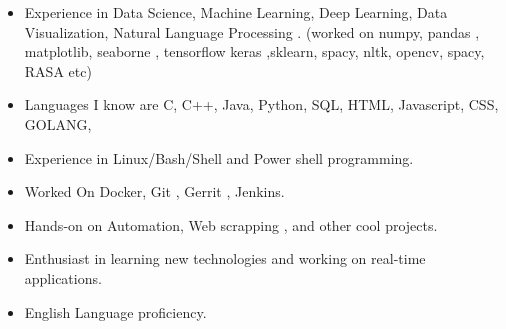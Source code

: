 \documentclass[10pt,a4paper,ragged2e,withhyper]{altacv}
\begin{document}
\begin{paracol}{2}
\begin{itemize}
\item Experience in Data Science, Machine Learning, Deep Learning, Data Visualization, Natural Language Processing . (worked on numpy, pandas , matplotlib, seaborne , tensorflow keras ,sklearn, spacy, nltk, opencv, spacy, RASA etc)
\item Languages I know are  C, C++, Java, Python, SQL, HTML, Javascript, CSS, GOLANG, 
\item Experience in Linux/Bash/Shell and Power shell programming.
\item Worked On Docker, Git , Gerrit , Jenkins.
\item Hands-on on Automation, Web scrapping , and other cool projects.
\item Enthusiast in learning new technologies and working on real-time applications. 
\item English Language proficiency.
\end{itemize}

\divider
{}



\divider\smallskip

\end{paracol}
\end{document}
